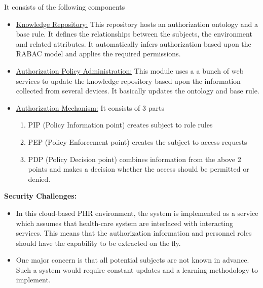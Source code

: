 \documentclass[letterpaper, 10 pt, conference]{ieeeconf}  %
\begin{document}
It consists of the following components
\begin{itemize}
\item \underline{Knowledge Repository:} This repository hosts an authorization ontology and a base rule. It defines the relationships between the subjects, the environment and related attributes. It automatically infers authorization based upon the RABAC model and applies the required permissions.
\item \underline{Authorization Policy Administration:} This module uses a a bunch of web services to update the knowledge repository based upon the information collected from several devices. It basically updates the ontology and base rule.
\item \underline{Authorization Mechanism:} It consists of 3 parts
\begin{enumerate}
\item PIP (Policy Information point) creates subject to role rules
\item PEP (Policy Enforcement point) creates the subject to access requests
\item PDP (Policy Decision point) combines information from the above 2 points and makes a decision whether the access should be permitted or denied.
\end{enumerate}
\end{itemize}
\textbf{Security Challenges:} 
\begin{itemize}
\item In this cloud-based PHR environment, the system is implemented as a service which assumes that health-care system are interlaced with interacting services. This means that the authorization information and personnel roles should have the capability to be extracted on the fly.
\item One major concern is that all potential subjects are not known in advance. Such a system would require constant updates and a learning methodology to implement.
\end{itemize}
\end{document}
